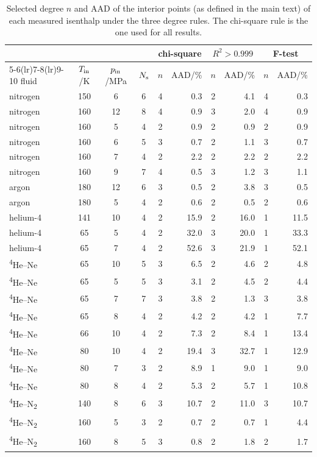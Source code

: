 \begin{table}[h]
  \centering
  \footnotesize
  \caption{\label{tab:si_sens}Selected degree $n$ and AAD of the interior points (as defined in the main text) of each measured isenthalp under the three degree rules. The chi-square rule is the one used for all results.}
  \begin{tabular}{lccccrcrcr}
    \toprule
    & & & & \multicolumn{2}{c}{chi-square} & \multicolumn{2}{c}{$R^2 > 0.999$} & \multicolumn{2}{c}{F-test} \\
    \cmidrule(lr){5-6}\cmidrule(lr){7-8}\cmidrule(lr){9-10}
    fluid & $T_{\rm in}$/K & $p_{\rm in}$/MPa & $N_{\rm s}$ & $n$ & AAD/\% & $n$ & AAD/\% & $n$ & AAD/\% \\
    \midrule
    nitrogen & 150 & 6 & 6 & 4 & 0.3 & 2 & 4.1 & 4 & 0.3 \\
    nitrogen & 160 & 12 & 8 & 4 & 0.9 & 3 & 2.0 & 4 & 0.9 \\
    nitrogen & 160 & 5 & 4 & 2 & 0.9 & 2 & 0.9 & 2 & 0.9 \\
    nitrogen & 160 & 6 & 5 & 3 & 0.7 & 2 & 1.1 & 3 & 0.7 \\
    nitrogen & 160 & 7 & 4 & 2 & 2.2 & 2 & 2.2 & 2 & 2.2 \\
    nitrogen & 160 & 9 & 7 & 4 & 0.5 & 3 & 1.2 & 3 & 1.1 \\
    argon & 180 & 12 & 6 & 3 & 0.5 & 2 & 3.8 & 3 & 0.5 \\
    argon & 180 & 5 & 4 & 2 & 0.6 & 2 & 0.5 & 2 & 0.6 \\
    helium-4 & 141 & 10 & 4 & 2 & 15.9 & 2 & 16.0 & 1 & 11.5 \\
    helium-4 & 65 & 5 & 4 & 2 & 32.0 & 3 & 20.0 & 1 & 33.3 \\
    helium-4 & 65 & 7 & 4 & 2 & 52.6 & 3 & 21.9 & 1 & 52.1 \\
    \textsuperscript{4}He--Ne & 65 & 10 & 5 & 3 & 6.5 & 2 & 4.6 & 2 & 4.8 \\
    \textsuperscript{4}He--Ne & 65 & 5 & 5 & 3 & 3.1 & 2 & 4.5 & 2 & 4.4 \\
    \textsuperscript{4}He--Ne & 65 & 7 & 7 & 3 & 3.8 & 2 & 1.3 & 3 & 3.8 \\
    \textsuperscript{4}He--Ne & 65 & 8 & 4 & 2 & 4.2 & 2 & 4.2 & 1 & 7.7 \\
    \textsuperscript{4}He--Ne & 66 & 10 & 4 & 2 & 7.3 & 2 & 8.4 & 1 & 13.4 \\
    \textsuperscript{4}He--Ne & 80 & 10 & 4 & 2 & 19.4 & 3 & 32.7 & 1 & 12.9 \\
    \textsuperscript{4}He--Ne & 80 & 7 & 3 & 2 & 8.9 & 1 & 9.0 & 1 & 9.0 \\
    \textsuperscript{4}He--Ne & 80 & 8 & 4 & 2 & 5.3 & 2 & 5.7 & 1 & 10.8 \\
    \textsuperscript{4}He--N\textsubscript{2} & 140 & 8 & 6 & 3 & 10.7 & 2 & 11.0 & 3 & 10.7 \\
    \textsuperscript{4}He--N\textsubscript{2} & 160 & 5 & 3 & 2 & 0.7 & 2 & 0.7 & 1 & 4.4 \\
    \textsuperscript{4}He--N\textsubscript{2} & 160 & 8 & 5 & 3 & 0.8 & 2 & 1.8 & 2 & 1.7 \\
    \bottomrule
  \end{tabular}
\end{table}
